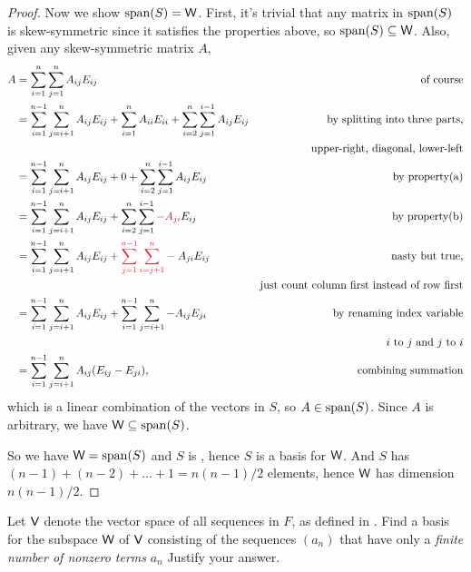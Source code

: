 \begin{proof}
Now we show \(\operatorname{span}(S) = \textsf{W}\).
First, it's trivial that any matrix in \(\operatorname{span}(S)\) is skew-symmetric since it satisfies the properties above, so \(\operatorname{span}(S) \subseteq \textsf{W}\).
Also, given any skew-symmetric matrix \(A\),
\begin{align*}
    A & = \sum_{i = 1}^{n} \sum_{j = 1}^n A_{ij} E_{ij} & \text{of course} \\
      & = \sum_{i = 1}^{n - 1} \sum_{j = i + 1}^n A_{ij} E_{ij} + \sum_{i = 1}^n A_{ii} E_{ii} + \sum_{i = 2}^n \sum_{j = 1}^{i - 1} A_{ij} E_{ij} & \text{by splitting into three parts,} \\
      & & \text{upper-right, diagonal, lower-left} \\
      & = \sum_{i = 1}^{n - 1} \sum_{j = i + 1}^n A_{ij} E_{ij} + 0 + \sum_{i = 2}^n \sum_{j = 1}^{i - 1} A_{ij} E_{ij} & \text{by property(a)} \\
      & = \sum_{i = 1}^{n - 1} \sum_{j = i + 1}^n A_{ij} E_{ij} + \sum_{i = 2}^n \sum_{j = 1}^{i - 1} \MAROON{-A_{ji}} E_{ij} & \text{by property(b)} \\
      & = \sum_{i = 1}^{n - 1} \sum_{j = i + 1}^n A_{ij} E_{ij} + \RED{\sum_{j = 1}^{n - 1} \sum_{i = j + 1}^n} -A_{ji} E_{ij} & \text{nasty but true,} \\
      & & \text{just count column first instead of row first} \\
      & = \sum_{i = 1}^{n - 1} \sum_{j = i + 1}^n A_{ij} E_{ij} + \sum_{i = 1}^{n - 1} \sum_{j = i + 1}^n -A_{ij} E_{ji} & \text{by renaming index variable} \\
      & & \text{\(i\) to \(j\) and \(j\) to \(i\)} \\
      & = \sum_{i = 1}^{n - 1} \sum_{j = i + 1}^n A_{ij} (E_{ij} - E_{ji}), & \text{combining summation}
\end{align*}
which is a linear combination of the vectors in \(S\), so \(A \in \operatorname{span}(S)\).
Since \(A\) is arbitrary, we have \(\textsf{W} \subseteq \operatorname{span}(S)\).

So we have \(\textsf{W} = \operatorname{span}(S)\) and \(S\) is \LID{}, hence \(S\) is a basis for \(\textsf{W}\).
And \(S\) has \((n - 1) + (n - 2) + ... + 1 = n(n - 1)/2\) elements, hence \(\textsf{W}\) has dimension \(n(n - 1)/2\).
\end{proof}

\begin{exercise} \label{exercise 1.6.18}
Let \(\textsf{V}\) denote the vector space of all sequences in \(F\), as defined in .
Find a basis for the subspace \(\textsf{W}\) of \(\textsf{V}\) consisting of the sequences \((a_n)\) that have only a \emph{finite number of nonzero terms} \(a_n\)
Justify your answer.
\end{exercise}

